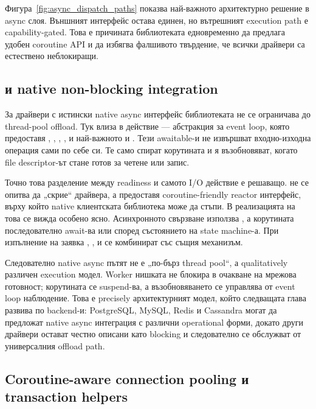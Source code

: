Фигура~\ref{fig:async_dispatch_paths} показва най-важното архитектурно решение в async слоя. Външният интерфейс остава единен, но вътрешният execution path е capability-gated. Това е причината библиотеката едновременно да предлага удобен coroutine API и да избягва фалшивото твърдение, че всички драйвери са естествено неблокиращи.

\subsection{ и native non-blocking integration}

За драйвери с истински native async интерфейс библиотеката не се ограничава до thread-pool offload. Тук влиза в действие  --- абстракция за event loop, която предоставя , , , ,  и най-важното  и . Тези awaitable-и не извършват входно-изходна операция сами по себе си. Те само спират корутината и я възобновяват, когато file descriptor-ът стане готов за четене или запис.

Точно това разделение между readiness и самото I/O действие е решаващо.  не се опитва да „скрие“ драйвера, а предоставя coroutine-friendly reactor интерфейс, върху който native клиентската библиотека може да стъпи. В реализацията на  това се вижда особено ясно. Асинхронното свързване използва , а корутината последователно await-ва  или  според състоянието на  state machine-а. При изпълнение на заявка , ,  и  се комбинират със същия  механизъм.

Следователно native async пътят не е „по-бърз thread pool“, а qualitatively различен execution модел. Worker нишката не блокира в очакване на мрежова готовност; корутината се suspend-ва, а възобновяването се управлява от event loop наблюдение. Това е precisely архитектурният модел, който следващата глава развива по backend-и: PostgreSQL, MySQL, Redis и Cassandra могат да предложат native async интеграция с различни operational форми, докато други драйвери остават честно описани като blocking и следователно се обслужват от универсалния offload path.

\subsection{Coroutine-aware connection pooling и transaction helpers}


